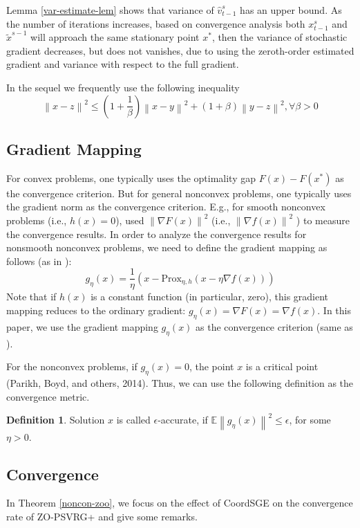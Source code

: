 \documentclass{article}
\newcommand*{\Po}{\text{Prox}}
\newcommand*{\E}{\mathbb{E}}
\newcommand{\norm}[1]{\left\lVert#1\right\rVert}
\theoremstyle{definition}
\newtheorem{definition}[theorem]{Definition}
\theoremstyle{remark}
\begin{document}
{\color{Green}
Lemma \ref{var-estimate-lem} shows that variance of $\hat{v}_{t-1}^s$ has an upper bound. As the number of iterations increases, based on convergence analysis both $x_{t-1}^s$ and $\tilde{x}^{s-1}$ will approach the same stationary point $x^*$, then the
variance of stochastic gradient decreases, but does not vanishes, due to using the zeroth-order estimated gradient and variance with respect to the full gradient.
}

In the sequel we frequently use the following inequality
\begin{equation}\label{young}
\norm{x-z}^2 \leq (1+\frac{1}{\beta})\norm{x-y}^2 + (1+\beta) \norm{{y-z}}^2, \forall \beta> 0
\end{equation}
\subsection{Gradient Mapping}
{\color{Violet}
For convex problems, one typically uses the optimality gap $F(x) - F(x^*)$ as the convergence criterion. But for general nonconvex problems, one typically uses the gradient norm as the convergence
criterion. E.g., for smooth nonconvex problems (i.e., $h(x) = 0$), \cite{ghadimi2013stochastic,reddi2016stochastic,
lei2017non,liu2018zeroth}  used $\norm{\nabla F(x)}^2$ (i.e., $\norm{\nabla f(x)}^2$ ) to measure the convergence results. In order to analyze the
convergence results for nonsmooth nonconvex problems, we need to define the gradient mapping as follows (as in \cite{ghadimi2016accelerated,reddi2016proximal,huang2019faster}):
\begin{equation}
g_{\eta}(x) = \frac{1}{\eta}(x-\Po_{\eta,h}(x-\eta \nabla f(x)))
\end{equation}
Note that if $h(x)$ is a constant function (in particular, zero), this gradient mapping reduces to the ordinary gradient:
$g_{\eta}(x) = \nabla F(x) = \nabla f(x)$. In this paper, we use the gradient mapping $g_{\eta}(x)$ as the convergence criterion (same as
\cite{ghadimi2016accelerated,reddi2016proximal,parikh2014proximal}).}
{\color{Green}
For the nonconvex problems, if $g_{\eta}(x) = 0$, the point $x$ is a critical point (Parikh, Boyd, and others, 2014). Thus, we can
use the following definition as the convergence metric.
\begin{definition}
Solution $x$ is called $\epsilon$-accurate, if $\E\norm{g_{\eta}(x)}^2 \leq \epsilon$, for some $\eta > 0$.
\end{definition}
}
\subsection{Convergence}
In Theorem \ref{noncon-zoo}, we focus on the effect of CoordSGE on the convergence rate of ZO-PSVRG+ and give some remarks.
\end{document}
